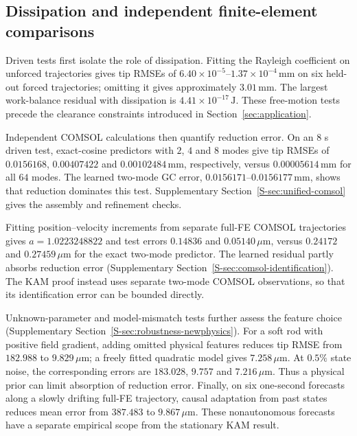 \subsection{Dissipation and independent finite-element comparisons}
\label{sec:core-physical-comparisons}
Driven tests first isolate the role of dissipation. Fitting the Rayleigh
coefficient on unforced trajectories gives tip RMSEs of
$6.40\times10^{-5}$--$1.37\times10^{-4}\,\mathrm{mm}$ on six held-out
forced trajectories; omitting it gives approximately $3.01\,\mathrm{mm}$.
The largest work-balance residual with dissipation is
$4.41\times10^{-17}\,\mathrm J$. These free-motion tests precede the
clearance constraints introduced in Section~\ref{sec:application}.

Independent COMSOL calculations then quantify reduction error.
On an $8$ s driven test, exact-cosine predictors with $2$, $4$ and $8$
modes give tip RMSEs of $0.0156168$, $0.00407422$ and
$0.00102484\,\mathrm{mm}$, respectively, versus
$0.00005614\,\mathrm{mm}$ for all $64$ modes.
The learned two-mode GC error, $0.0156171$--$0.0156177\,\mathrm{mm}$,
shows that reduction dominates this test. Supplementary
Section~\ref{S-sec:unified-comsol} gives the assembly and refinement checks.

Fitting position--velocity increments from separate full-FE COMSOL
trajectories gives $a=1.0223248822$ and test errors $0.14836$ and
$0.05140\,\mu\mathrm m$, versus $0.24172$ and $0.27459\,\mu\mathrm m$
for the exact two-mode predictor. The learned residual partly absorbs
reduction error (Supplementary Section~\ref{S-sec:comsol-identification}).
The KAM proof instead uses separate two-mode COMSOL observations,
so that its identification error can be bounded directly.

Unknown-parameter and model-mismatch tests further assess the feature
choice (Supplementary Section~\ref{S-sec:robustness-newphysics}).
For a soft rod with positive field gradient, adding omitted physical
features reduces tip RMSE from $182.988$ to $9.829\,\mu\mathrm m$;
a freely fitted quadratic model gives $7.258\,\mu\mathrm m$.
At $0.5\%$ state noise, the corresponding errors are $183.028$,
$9.757$ and $7.216\,\mu\mathrm m$. Thus a physical prior can limit
absorption of reduction error. Finally, on six one-second forecasts
along a slowly drifting full-FE trajectory, causal adaptation from past
states reduces mean error from $387.483$ to $9.867\,\mu\mathrm m$.
These nonautonomous forecasts have a separate empirical scope from the
stationary KAM result.
